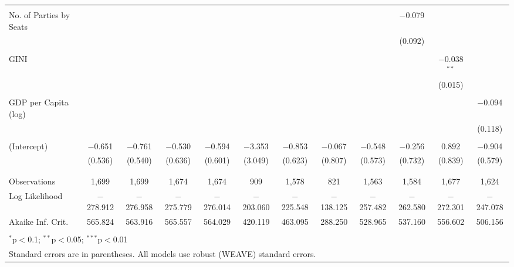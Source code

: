 \documentclass[a4paper]{article}\usepackage[]{graphicx}\usepackage[]{color}
\begin{document}
\begin{table}
\begin{center}
{{\begin{tabular}{@{\extracolsep{5pt}}lccccccccccc}
  & & & & & & & & & & & \\ 
 No. of Parties by Seats &  &  &  &  &  &  &  &  & $-$0.079 &  &  \\ 
  &  &  &  &  &  &  &  &  & (0.092) &  &  \\ 
  & & & & & & & & & & & \\ 
 GINI &  &  &  &  &  &  &  &  &  & $-$0.038$^{**}$ &  \\ 
  &  &  &  &  &  &  &  &  &  & (0.015) &  \\ 
  & & & & & & & & & & & \\ 
 GDP per Capita (log) &  &  &  &  &  &  &  &  &  &  & $-$0.094 \\ 
  &  &  &  &  &  &  &  &  &  &  & (0.118) \\ 
  & & & & & & & & & & & \\ 
 (Intercept) & $-$0.651 & $-$0.761 & $-$0.530 & $-$0.594 & $-$3.353 & $-$0.853 & $-$0.067 & $-$0.548 & $-$0.256 & 0.892 & $-$0.904 \\ 
  & (0.536) & (0.540) & (0.636) & (0.601) & (3.049) & (0.623) & (0.807) & (0.573) & (0.732) & (0.839) & (0.579) \\ 
  & & & & & & & & & & & \\ 
\hline \\[-1.8ex] 
Observations & 1,699 & 1,699 & 1,674 & 1,674 & 909 & 1,578 & 821 & 1,563 & 1,584 & 1,677 & 1,624 \\ 
Log Likelihood & $-$278.912 & $-$276.958 & $-$275.779 & $-$276.014 & $-$203.060 & $-$225.548 & $-$138.125 & $-$257.482 & $-$262.580 & $-$272.301 & $-$247.078 \\ 
Akaike Inf. Crit. & 565.824 & 563.916 & 565.557 & 564.029 & 420.119 & 463.095 & 288.250 & 528.965 & 537.160 & 556.602 & 506.156 \\ 
\hline 
\hline \\[-1.8ex] 
\multicolumn{12}{l}{$^{*}$p$<$0.1; $^{**}$p$<$0.05; $^{***}$p$<$0.01} \\ 
\multicolumn{12}{l}{Standard errors are in parentheses. All models use robust (WEAVE) standard errors.} \\ 
\end{tabular} 

}}
\end{center}

\end{table}
\end{document}
